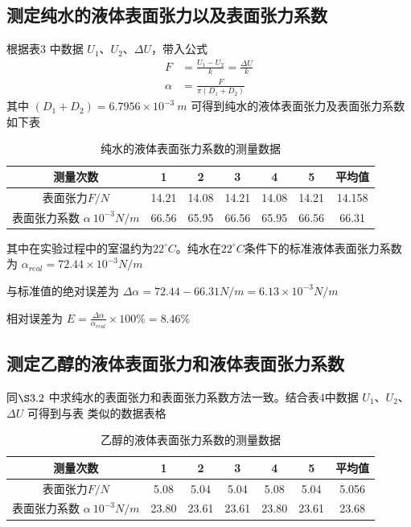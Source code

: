 \documentclass[UTF8]{ctexart}
\begin{document}
\subsection{测定纯水的液体表面张力以及表面张力系数}
根据表3 中数据 $U_1$、$U_2$、$\Delta U$，带入公式
\begin{align*}
    F &= \frac{U_1-U_2}{k} = \frac{\Delta U}{k} \\
    \alpha &= \frac{F}{\pi(D_1+D_2)}
\end{align*}
其中 $(D_1+D_2) = 6.7956 \times 10^{-3} \ m$ 可得到纯水的液体表面张力及表面张力系数如下表

\hspace{-2cm}
\begin{table}[H]
\caption{纯水的液体表面张力系数的测量数据}
\begin{tabular}{|c|c|c|c|c|c|c|}
\hline
     测量次数 & 1 & 2 & 3 & 4 & 5  & 平均值 \\
\hline
     表面张力$F/N$ & 14.21 & 14.08 & 14.21 & 14.08 & 14.21  & 14.158 \\ 
\hline
     表面张力系数 $\alpha \  10^{-3}N/m$ & 66.56 & 65.95 & 66.56 & 65.95  & 66.56 & 66.31\\
\hline
\end{tabular}
\end{table}
其中在实验过程中的室温约为$22^{\circ}C$。纯水在$22^{\circ}C$条件下的标准液体表面张力系数为 $\alpha_{real} = 72.44 \times 10^{-3} N/m$

与标准值的绝对误差为 $\Delta \alpha = 72.44 - 66.31 N/m = 6.13 \times 10^{-3} N/m$

相对误差为  $E=\frac{\Delta \alpha}{\alpha_{real}}\times 100\% = 8.46\%$

\subsection{测定乙醇的液体表面张力和液体表面张力系数}
同$\S 3.2$ 中求纯水的表面张力和表面张力系数方法一致。结合表4中数据 $U_1$、$U_2$、$\Delta U$
可得到与表 类似的数据表格
\begin{table}
\caption{乙醇的液体表面张力系数的测量数据}
\begin{tabular}{|c|c|c|c|c|c|c|}
\hline
     测量次数 & 1 & 2 & 3 & 4 & 5  & 平均值 \\
\hline
     表面张力$F/N$ & 5.08 & 5.04 & 5.04 & 5.08& 5.04  & 5.056 \\ 
\hline
     表面张力系数 $\alpha \  10^{-3}N/m$ & 23.80& 23.61 &23.61 & 23.80&23.61  &23.68 \\
\hline
\end{tabular}
\end{table}
\end{document}
